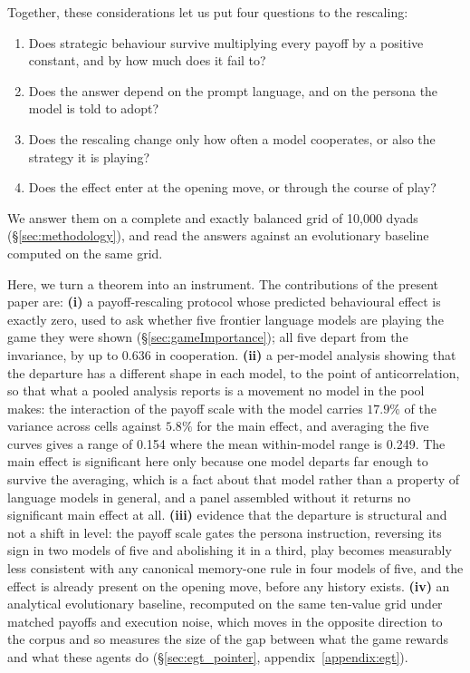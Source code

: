 \documentclass[openacc]{rsproca_new}
\begin{document}
Together, these considerations let us put four questions to the rescaling:
\begin{enumerate}[(1)]
\item Does strategic behaviour survive multiplying every payoff by a positive
      constant, and by how much does it fail to?
\item Does the answer depend on the prompt language, and on the persona the
      model is told to adopt?
\item Does the rescaling change only how often a model cooperates, or also the
      strategy it is playing?
\item Does the effect enter at the opening move, or through the course of play?
\end{enumerate}
We answer them on a complete and exactly balanced grid of 10{,}000 dyads
(\S\ref{sec:methodology}), and read the answers against an evolutionary
baseline computed on the same grid.

Here, we turn a theorem into an instrument. The contributions of the present
paper are: \textbf{(i)} a payoff-rescaling protocol whose predicted behavioural
effect is exactly zero, used to ask whether five frontier language models are
playing the game they were shown (\S\ref{sec:gameImportance}); all five depart
from the invariance, by up to 0.636 in cooperation. \textbf{(ii)} a per-model
analysis showing that the departure has a different shape in each model, to the
point of anticorrelation, so that what a pooled analysis reports is a movement
no model in the pool makes: the interaction of the payoff scale with the model
carries $17.9\%$ of the variance across cells against $5.8\%$ for the main
effect, and averaging the five curves gives a range of 0.154 where the mean
within-model range is 0.249. The main effect is significant here only because
one model departs far enough to survive the averaging, which is a fact about
that model rather than a property of language models in general, and a panel
assembled without it returns no significant main effect at all.
\textbf{(iii)} evidence that the departure is structural and not a shift in
level: the payoff scale gates the persona instruction, reversing its sign in
two models of five and abolishing it in a third, play becomes measurably less
consistent with any canonical memory-one rule in four models of five, and the
effect is already present on the opening move, before any history exists.
\textbf{(iv)} an analytical evolutionary baseline, recomputed on the same
ten-value grid under matched payoffs and execution noise, which moves in the
opposite direction to the corpus and so measures the size of the gap between
what the game rewards and what these agents do
(\S\ref{sec:egt_pointer}, appendix~\ref{appendix:egt}).
\end{document}
